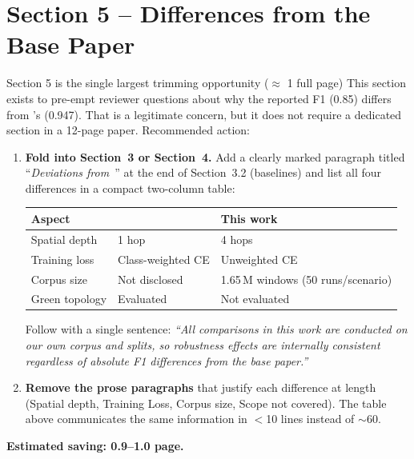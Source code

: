 \documentclass[11pt,a4paper]{article}
\begin{document}
\section{Section 5 -- Differences from the Base Paper}

\begin{trimbox}{Section 5 is the single largest trimming opportunity ($\approx$ 1 full page)}
This section exists to pre-empt reviewer questions about why the reported F1
(0.85) differs from \cite{Karabulut2026}'s (0.947). That is a legitimate
concern, but it does not require a dedicated section in a 12-page paper.
Recommended action:
\begin{enumerate}[leftmargin=*,label=\arabic*.]
  \item \textbf{Fold into Section~3 or Section~4.} Add a clearly marked
    paragraph titled ``\textit{Deviations from~\cite{Karabulut2026}}'' at the
    end of Section~3.2 (baselines) and list all four differences in a compact
    two-column table:
    \begin{center}
    \small
    \begin{tabular}{lll}
      \toprule
      Aspect & \cite{Karabulut2026} & This work \\
      \midrule
      Spatial depth & 1 hop & 4 hops \\
      Training loss & Class-weighted CE & Unweighted CE \\
      Corpus size & Not disclosed & 1.65\,M windows (50 runs/scenario)\\
      Green topology & Evaluated & Not evaluated \\
      \bottomrule
    \end{tabular}
    \end{center}
    Follow with a single sentence: \textit{``All comparisons in this work are
    conducted on our own corpus and splits, so robustness effects are
    internally consistent regardless of absolute F1 differences from the base
    paper.''}
  \item \textbf{Remove the prose paragraphs} that justify each difference at
    length (Spatial depth, Training Loss, Corpus size, Scope not covered).
    The table above communicates the same information in $<$10 lines instead
    of $\sim$60.
\end{enumerate}
\textbf{Estimated saving: 0.9--1.0 page.}
\end{trimbox}
\end{document}
